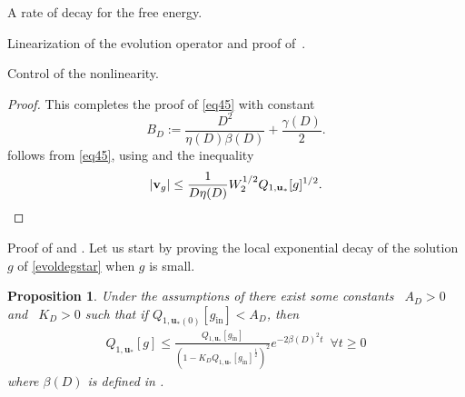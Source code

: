 \documentclass[reqno]{amsart} %
\newtheorem{proposition}{Proposition}[section]
\begin{document}
\begin{section}{A rate of decay for the free energy.}
\begin{section}{Linearization of the evolution operator and proof of~\texorpdfstring{}{thm3}.}
\begin{subsection}{Control of the nonlinearity.}
\begin{proof}
This completes the proof of \eqref{eq45} with constant 
$$B_D:= \frac{D^2}{\eta(D) \beta(D)}+ \frac{\gamma(D)}{2}.$$
 follows from \eqref{eq45}, using   and the inequality 
\begin{equation*}
    |\mathbf{v}_g| \leq \frac{1}{D\eta(D)} W_2^{1/2} Q_{1,\mathbf{u}_*}[g]^{1/2}. \qedhere
\end{equation*}
\end{proof}





\end{subsection}

\begin{subsection}{Proof of  \texorpdfstring{}{thme1} and \texorpdfstring{}{thm3}.}
\label{subsec: preuvethme2}
Let us start by proving the local exponential decay of the solution $g$ of \eqref{evoldegstar} when $g$ is small.

 \begin{proposition}
\label{thme1}
Under the assumptions of  there exist some constants ~$A_D>0$ and \mbox{~$K_D>0$} such that if \mbox{$Q_{1,\mathbf{u}_*(0)}[g_{\mathrm{in}}]<A_D$}, then
\begin{align*}
    {Q_{1,\mathbf{u}_*}[g]}\leq\frac{Q_{1,\mathbf{u}_*}[g_{\mathrm{in}}]}{\left(1-K_D Q_{1,\mathbf{u}_*}[g_{\mathrm{in}}]^{\frac{1}{2}}\right)^2} e^{-2\beta(D)^2t} \, \, \, \forall t \geq 0
\end{align*}
 where $\beta(D)$ is defined in .
\end{proposition}


\end{subsection}
\end{section}
\end{section}
\end{document}
